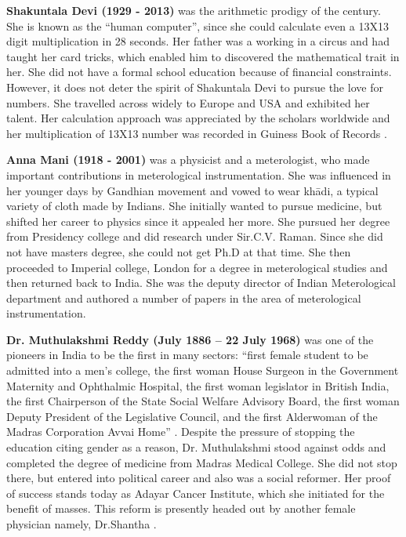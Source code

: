 \documentclass[a4paper,10pt]{article}
\begin{document}
\newblock
\textbf{Shakuntala Devi (1929 - 2013)} was the arithmetic prodigy of the century. She is known as the ``human computer'', since she could calculate even a 13X13 digit multiplication in 28 seconds. Her father was a working in a circus and had taught her card tricks, which enabled him to discovered the mathematical trait in her. She did not have a formal school education because of financial constraints. However, it does not deter the spirit of Shakuntala Devi to pursue the love for numbers. She travelled across widely to Europe and USA and exhibited her talent. Her calculation approach was appreciated by the scholars worldwide and her multiplication of 13X13 number was recorded in Guiness Book of Records \cite{shakuntala}. 

\newblock
\textbf{Anna Mani (1918 - 2001)} was a physicist and a meterologist, who made important contributions in meterological instrumentation. She was influenced in her younger days by Gandhian movement and vowed to wear kh\={a}di, a typical variety of cloth made by Indians. She initially wanted to pursue medicine, but shifted her career to physics since it appealed her more. She pursued her degree from Presidency college and did research under Sir.C.V. Raman. Since she did not have masters degree, she could not get Ph.D at that time. She then proceeded to Imperial college, London for a degree in meterological studies and then returned back to India. She was the deputy director of Indian Meterological department and authored a number of papers in the area of meterological instrumentation. \cite{anna}

\textbf{Dr. Muthulakshmi Reddy (July 1886 – 22 July 1968)} was one of the pioneers in India to be the first in many sectors: ``first female student to be admitted into a men's college, the first woman House Surgeon in the Government Maternity and Ophthalmic Hospital, the first woman legislator in British India, the first Chairperson of the State Social Welfare Advisory Board, the first woman Deputy President of the Legislative Council, and the first Alderwoman of the Madras Corporation Avvai Home'' \cite{reddy}. Despite the pressure of stopping the education citing gender as a reason, Dr. Muthulakshmi stood against odds and completed the degree of medicine from Madras Medical College. She did not stop there, but entered into political career and also was a social reformer. Her proof of success stands today as Adayar Cancer Institute, which she initiated for the benefit of masses. This reform is presently headed out by another female physician namely, Dr.Shantha \cite{shantha}. 
\end{document}
